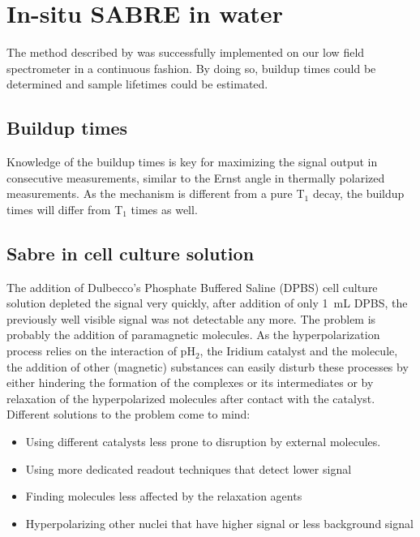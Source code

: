     \section{In-situ SABRE in water}
    The method described by \cite{truong_irreversible_2014-1} was successfully implemented on our low field spectrometer in a continuous fashion. By doing so, buildup times could be determined and sample lifetimes could be estimated.
        \subsection{Buildup times}
            Knowledge of the buildup times is key for maximizing the signal output in consecutive measurements, similar to the Ernst angle in thermally polarized measurements. As the mechanism is different from a pure T$_1$ decay, the buildup times will differ from T$_1$ times as well.
        \subsection{Sabre in cell culture solution}
        \label{sec:discussion:cellSolution}
        The addition of Dulbecco's Phosphate Buffered Saline (DPBS) cell culture solution depleted the signal very quickly, after addition of only \SI{1}{\milli\liter} DPBS, the previously well visible signal was not detectable any more. The problem is probably the addition of paramagnetic molecules. As the hyperpolarization process relies on the interaction of pH$_2$, the Iridium catalyst and the molecule, the addition of other (magnetic) substances can easily disturb these processes by either hindering the formation of the complexes or its intermediates or by relaxation of the hyperpolarized molecules after contact with the catalyst. Different solutions to the problem come to mind: 
            \begin{itemize}
            \setlength{\itemsep}{-7pt}
                \item Using different catalysts less prone to disruption by external molecules.
                \item Using more dedicated readout techniques that detect lower signal
                \item Finding molecules less affected by the relaxation agents
                \item Hyperpolarizing other nuclei that have higher signal or less background signal
            \end{itemize}
